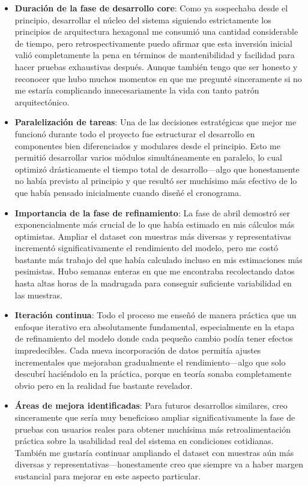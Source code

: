 \begin{itemize}
    \item \textbf{Duración de la fase de desarrollo core}: Como ya sospechaba desde el principio, desarrollar el núcleo del sistema siguiendo estrictamente los principios de arquitectura hexagonal me consumió una cantidad considerable de tiempo, pero retrospectivamente puedo afirmar que esta inversión inicial valió completamente la pena en términos de mantenibilidad y facilidad para hacer pruebas exhaustivas después. Aunque también tengo que ser honesto y reconocer que hubo muchos momentos en que me pregunté sinceramente si no me estaría complicando innecesariamente la vida con tanto patrón arquitectónico.
    
    \item \textbf{Paralelización de tareas}: Una de las decisiones estratégicas que mejor me funcionó durante todo el proyecto fue estructurar el desarrollo en componentes bien diferenciados y modulares desde el principio. Esto me permitió desarrollar varios módulos simultáneamente en paralelo, lo cual optimizó drásticamente el tiempo total de desarrollo—algo que honestamente no había previsto al principio y que resultó ser muchísimo más efectivo de lo que había pensado inicialmente cuando diseñé el cronograma.
    
    \item \textbf{Importancia de la fase de refinamiento}: La fase de abril demostró ser exponencialmente más crucial de lo que había estimado en mis cálculos más optimistas. Ampliar el dataset con muestras más diversas y representativas incrementó significativamente el rendimiento del modelo, pero me costó bastante más trabajo del que había calculado incluso en mis estimaciones más pesimistas. Hubo semanas enteras en que me encontraba recolectando datos hasta altas horas de la madrugada para conseguir suficiente variabilidad en las muestras.
    
    \item \textbf{Iteración continua}: Todo el proceso me enseñó de manera práctica que un enfoque iterativo era absolutamente fundamental, especialmente en la etapa de refinamiento del modelo donde cada pequeño cambio podía tener efectos impredecibles. Cada nueva incorporación de datos permitía ajustes incrementales que mejoraban gradualmente el rendimiento—algo que solo descubrí haciéndolo en la práctica, porque en teoría sonaba completamente obvio pero en la realidad fue bastante revelador.
    
    \item \textbf{Áreas de mejora identificadas}: Para futuros desarrollos similares, creo sinceramente que sería muy beneficioso ampliar significativamente la fase de pruebas con usuarios reales para obtener muchísima más retroalimentación práctica sobre la usabilidad real del sistema en condiciones cotidianas. También me gustaría continuar ampliando el dataset con muestras aún más diversas y representativas—honestamente creo que siempre va a haber margen sustancial para mejorar en este aspecto particular.
\end{itemize}

